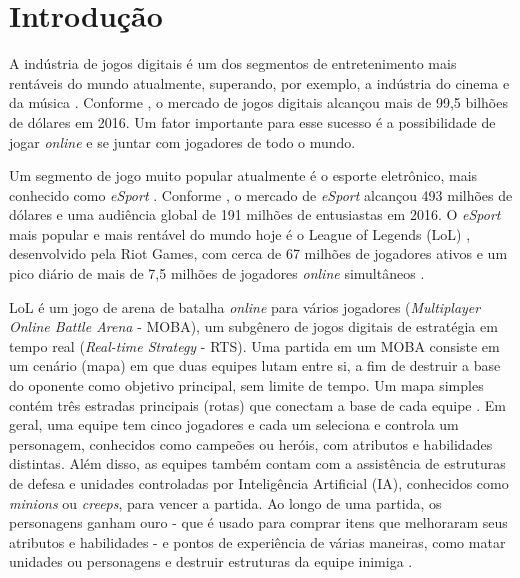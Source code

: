 \chapter{Introdu\c{c}\~{a}o}

A indústria de jogos digitais é um dos segmentos de entretenimento mais rentáveis do mundo atualmente, superando, por exemplo, a indústria do cinema e da música \cite{newzoo1} \cite{ifpi1} \cite{mpaa1}. Conforme \cite{newzoo1}, o mercado de jogos digitais alcançou mais de 99,5 bilhões de dólares em 2016. Um fator importante para esse sucesso é a possibilidade de jogar \textit{online} e se juntar com jogadores de todo o mundo.

Um segmento de jogo muito popular atualmente é o esporte eletrônico, mais conhecido como \textit{eSport} \cite{forbes1}. Conforme \cite{newzoo2}, o mercado de \textit{eSport} alcançou 493 milhões de dólares e uma audiência global de 191 milhões de entusiastas em 2016. O \textit{eSport} mais popular e mais rentável do mundo hoje é o League of Legends (LoL)  \cite{superdata1}, desenvolvido pela Riot Games, com cerca de 67 milhões de jogadores ativos e um pico diário de mais de 7,5 milhões de jogadores \textit{online} simultâneos \cite{riot1}.

LoL é um jogo de arena de batalha \textit{online} para vários jogadores (\textit{Multiplayer Online Battle Arena} - MOBA), um subgênero de jogos digitais de estratégia em tempo real (\textit{Real-time Strategy} - RTS). Uma partida em um MOBA consiste em um cenário (mapa) em que duas equipes lutam entre si, a fim de destruir a base do oponente como objetivo principal, sem limite de tempo. Um mapa simples contém três estradas principais (rotas) que conectam a base de cada equipe . Em geral, uma equipe tem cinco jogadores e cada um seleciona e controla um personagem, conhecidos como campeões ou heróis, com atributos e habilidades distintas. Além disso, as equipes também contam com a assistência de estruturas de defesa e unidades controladas por Inteligência Artificial (IA), conhecidos como \textit{minions} ou \textit{creeps}, para vencer a partida. Ao longo de uma partida, os personagens ganham ouro - que é usado para comprar itens que melhoraram seus atributos e habilidades - e pontos de experiência de várias maneiras, como matar unidades ou personagens e destruir estruturas da equipe inimiga \cite{league1}.

